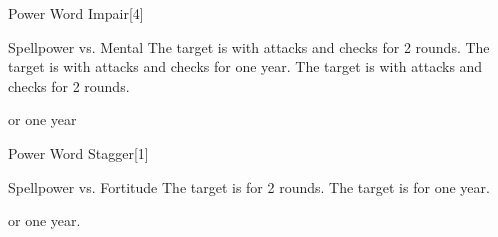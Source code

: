 \begin{spellsection}{Power Word Impair}[4]
    \begin{spellheader}
    \end{spellheader}
    \begin{spellcontent}
        \begin{spelltargetinginfo}
        \end{spelltargetinginfo}
        \begin{spelleffects}
            \begin{spellattack}{Spellpower vs. Mental}
                \spellsuccess The target is \severelyimpaired with attacks and checks for 2 rounds.
                \spellcritical The target is \severelyimpaired with attacks and checks for one year.
                \spellfailure The target is \impaired with attacks and checks for 2 rounds.
            \end{spellattack}
            \spelldur \durbrief or one year
        \end{spelleffects}
    \end{spellcontent}
    \begin{spellfooter}
        \miscastrandom
    \end{spellfooter}
\end{spellsection}

\begin{spellsection}{Power Word Stagger}[1]
    \begin{spellheader}
    \end{spellheader}
    \begin{spellcontent}
        \begin{spelltargetinginfo}
        \end{spelltargetinginfo}
        \begin{spelleffects}
            \begin{spellattack}{Spellpower vs. Fortitude}
                \spellsuccess The target is \staggered for 2 rounds.
                \spellcritical The target is \staggered for one year.
            \end{spellattack}
            \spelldur \durbrief or one year.
        \end{spelleffects}
    \end{spellcontent}
    \begin{spellfooter}
        \miscastrandom
    \end{spellfooter}
\end{spellsection}

